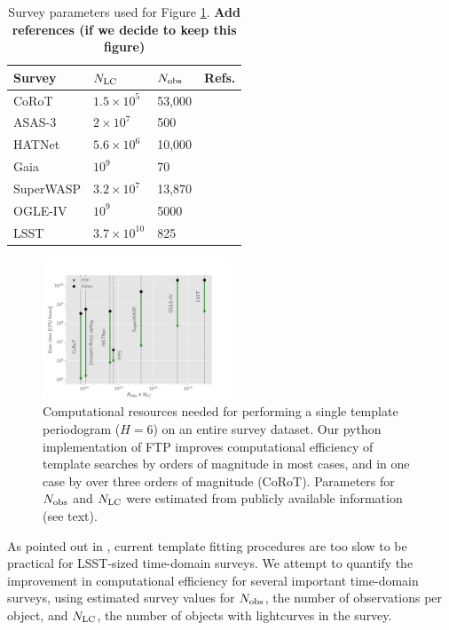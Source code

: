 \documentclass[iop]{emulateapj}
\newcommand{\todo}[1]{{\bf #1}}
\begin{document}
\begin{table}
\centering
\begin{tabular}{l|l|l|l}
Survey     & $N_{\rm LC}$ & $N_{\rm obs}$ & Refs. \\
\hline\hline
CoRoT      & $1.5\times 10^5$  &  53,000       &       \\
\hline
ASAS-3     &   $2\times 10^7$  &  500          &       \\
\hline
HATNet     & $5.6\times 10^6$  &  10,000       &       \\
\hline
Gaia       &           $10^9$  &  70           &       \\
\hline
SuperWASP  & $3.2\times 10^7$  &  13,870       &       \\
\hline
OGLE-IV    &           $10^9$  &  5000         &       \\
\hline
LSST       & $3.7\times 10^10$ &  825          &       \\
\hline
\end{tabular}
\caption{\label{tab:surveypars} Survey parameters used for Figure \ref{fig:surveys}.
\todo{Add references (if we decide to keep this figure)}}
\end{table}

\begin{figure}
\centering
\includegraphics[width=0.5\textwidth]{plots/timing_for_various_surveys.png}
\caption{\label{fig:surveys} Computational resources needed for performing 
a single template periodogram ($H=6$) on an entire survey dataset. Our
python implementation of FTP improves computational efficiency of template 
searches by orders of magnitude in most cases, and in one case by over 
three orders of magnitude (CoRoT). Parameters for $N_{\rm obs}$ and $N_{\rm LC}$
were estimated from publicly available information (see text).}
\end{figure}

As pointed out in \cite{Vanderplas+Ivezic_2015}, current template fitting
procedures are too slow to be practical for LSST-sized time-domain surveys.
We attempt to quantify the improvement in computational efficiency for
several important time-domain surveys, using estimated survey values for 
$N_{\rm obs}$, the number of observations per object, and $N_{\rm LC}$, 
the number of objects with lightcurves in the survey. 
\end{document}
